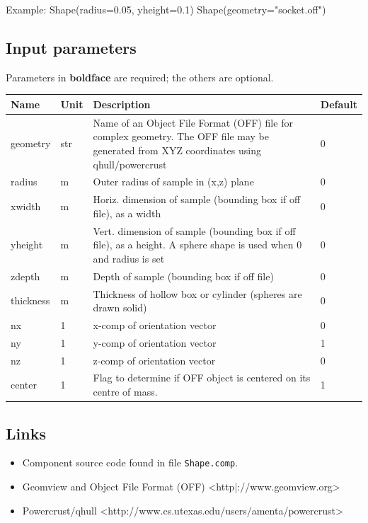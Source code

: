 Example: Shape(radius=0.05, yheight=0.1) Shape(geometry="socket.off")

\subsection*{Input parameters}
Parameters in \textbf{boldface} are required; the others are optional.

\begin{longtable}{p{}p{}p{}p{}}
\toprule
\textbf{Name} & \textbf{Unit} & \textbf{Description} & \textbf{Default} \\
\midrule
\endhead
geometry & str & Name of an Object File Format (OFF) file for complex geometry. The OFF file may be generated from XYZ coordinates using qhull/powercrust & 0 \\
radius & m & Outer radius of sample in (x,z) plane & 0 \\
xwidth & m & Horiz. dimension of sample (bounding box if off file), as a width & 0 \\
yheight & m & Vert.  dimension of sample (bounding box if off file), as a height. A sphere shape is used when 0 and radius is set & 0 \\
zdepth & m & Depth of sample (bounding box if off file) & 0 \\
thickness & m & Thickness of hollow box or cylinder (spheres are drawn solid) & 0 \\
nx & 1 & x-comp of orientation vector & 0 \\
ny & 1 & y-comp of orientation vector & 1 \\
nz & 1 & z-comp of orientation vector & 0 \\
center & 1 & Flag to determine if OFF object is centered on its centre of mass. & 1 \\
\bottomrule
\end{longtable}

\subsection*{Links}
\begin{itemize}
  \item Component source code found in file \texttt{Shape.comp}.
  \item Geomview and Object File Format (OFF) \textless{}http|://www.geomview.org\textgreater{}
  \item Powercrust/qhull \textless{}http://www.cs.utexas.edu/users/amenta/powercrust\textgreater{}
\end{itemize}
